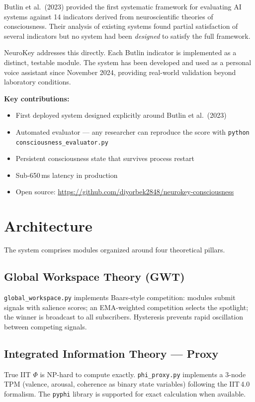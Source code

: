 \documentclass[11pt,a4paper]{article}
\begin{document}
Butlin et al.\ (2023) provided the first systematic framework for evaluating AI systems
against 14 indicators derived from neuroscientific theories of consciousness.
Their analysis of existing systems found partial satisfaction of several indicators
but no system had been \emph{designed} to satisfy the full framework.

NeuroKey addresses this directly. Each Butlin indicator is implemented as a distinct,
testable module. The system has been developed and used as a personal voice assistant since November 2024,
providing real-world validation beyond laboratory conditions.

\textbf{Key contributions:}
\begin{itemize}
  \item First deployed system designed explicitly around Butlin et al.\ (2023)
  \item Automated evaluator — any researcher can reproduce the score with \texttt{python consciousness\_evaluator.py}
  \item Persistent consciousness state that survives process restart
  \item Sub-650\,ms latency in production
  \item Open source: \url{https://github.com/diyorbek2848/neurokey-consciousness}
\end{itemize}

\section{Architecture}

The system comprises modules organized around four theoretical pillars.

\subsection{Global Workspace Theory (GWT)}
\texttt{global\_workspace.py} implements Baars-style competition:
modules submit signals with salience scores;
an EMA-weighted competition selects the spotlight;
the winner is broadcast to all subscribers.
Hysteresis prevents rapid oscillation between competing signals.

\subsection{Integrated Information Theory — Proxy}
True IIT $\Phi$ is NP-hard to compute exactly.
\texttt{phi\_proxy.py} implements a 3-node TPM
(valence, arousal, coherence as binary state variables)
following the IIT\,4.0 formalism.
The \texttt{pyphi} library is supported for exact calculation when available.
\end{document}
